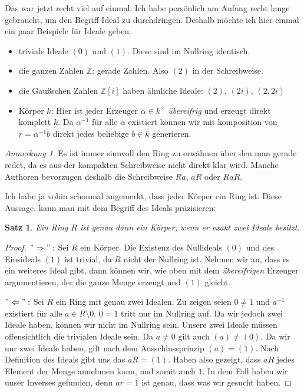 \documentclass{article}
\newtheorem*{satz}{Satz}
\theoremstyle{definition}
\theoremstyle{remark}
\newtheorem*{anm}{Anmerkung}
\begin{document}
\vspace{0.7em}
Das war jetzt recht viel auf einmal. Ich habe persönlich am Anfang recht lange gebraucht, um den Begriff Ideal
zu durchdringen. Deshalb möchte ich hier einmal ein paar Beispiele für Ideale geben. 
\begin{itemize}
    \item triviale Ideale $(0)$ und $(1)$. Diese sind im Nullring identisch.
    \item die ganzen Zahlen $\mathbb Z$: gerade Zahlen. Also $(2)$ in der Schreibweise.
    \item die Gaußschen Zahlen $\mathbb Z[i]$ haben ähnliche Ideale: $(2)$, $(2i)$, $(2,2i)$
    \item Körper $k$: Hier ist jeder Erzeuger $\alpha\in k^\times$ \emph{übereifrig} und erzeugt direkt
        komplett $k$. Da $\alpha^{-1}$ für alle $\alpha$ existiert können wir mit komposition von
        $r=\alpha^{-1}b$ direkt jedes beliebige $b\in k$ generieren.
\end{itemize}

\begin{anm}
Es ist immer sinnvoll den Ring zu erwähnen über den man gerade redet, da es aus der kompakten Schreibweise
nicht direkt klar wird. Manche Authoren bevorzugen deshalb die Schreibweise $Ra$, $aR$ oder $RaR$.
\end{anm}

Ich habe ja vohin schonmal angemerkt, dass jeder Körper ein Ring ist. Diese Aussage, kann man mit dem
Begriff des Ideals präzisieren:

\begin{satz}
Ein Ring $R$ ist genau dann ein Körper, wenn er exakt zwei Ideale besitzt.
\end{satz}
\begin{proof} $"\Rightarrow":$ Sei $R$ ein Körper. Die Existenz des Nullideals $(0)$ und des Einsideals $(1)$
ist trivial, da $R$ nicht der Nullring ist. Nehmen wir an, dass es ein weiteres Ideal gibt, dann können wir,
wie oben mit dem \emph{übereifrigen} Erzeuger argumentieren, der die ganze Menge erzeugt und $(1)$ gleicht.

\vspace{0.7em}
$"\Leftarrow":$ Sei $R$ ein Ring mit genau zwei Idealen. Zu zeigen seien $0\ne1$ und $a^{-1}$ existiert für
alle $a\in R\setminus 0$. $0=1$ tritt nur im Nullring auf. Da wir jedoch zwei Ideale haben, können wir nicht im
Nullring sein. Unsere zwei Ideale müssen offensichtlich die trivialen Ideale sein. Da $a\ne0$ gilt auch
$(a)\ne(0)$. Da wir nur zwei Ideale haben, gilt nach dem Ausschlussprinzip $(a)=(1)$. Nach Definition des Ideals gibt uns das
$aR=(1)$. Haben also gezeigt, dass $aR$ jedes Element der Menge annehmen kann, und somit auch $1$. In dem Fall
haben wir unser Inverses gefunden, denn $ar=1$ ist genau, dass was wir gesucht haben.
\end{proof}
\end{document}
